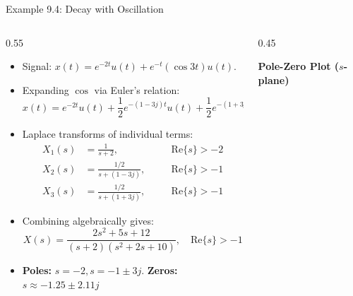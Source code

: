\begin{frame}{Example 9.4: Decay with Oscillation}
    \begin{columns}[T]
        \begin{column}{0.55\textwidth}
            \begin{itemize}
                \item Signal: $x(t) = e^{-2t}u(t) + e^{-t}(\cos 3t)u(t)$.
                \item Expanding $\cos$ via Euler's relation:
                      \begin{equation*}
                          x(t) = e^{-2t}u(t) + \frac{1}{2}e^{-(1-3j)t}u(t) + \frac{1}{2}e^{-(1+3j)t}u(t)
                      \end{equation*}
                \item Laplace transforms of individual terms:
                      \begin{align*}
                          X_1(s) & = \frac{1}{s+2}, \quad        &  & \text{Re}\{s\} > -2 \\
                          X_2(s) & = \frac{1/2}{s+(1-3j)}, \quad &  & \text{Re}\{s\} > -1 \\
                          X_3(s) & = \frac{1/2}{s+(1+3j)}, \quad &  & \text{Re}\{s\} > -1
                      \end{align*}
                \item Combining algebraically gives:
                      \begin{equation*}
                          X(s) = \frac{2s^2 + 5s + 12}{(s+2)(s^2 + 2s + 10)}, \quad \text{Re}\{s\} > -1
                      \end{equation*}
                \item \textbf{Poles:} $s = -2, s = -1 \pm 3j$. \textbf{Zeros:} $s \approx -1.25 \pm 2.11j$
            \end{itemize}
        \end{column}
        \begin{column}{0.45\textwidth}
            \begin{center}
                \vspace{0.6cm}
                \textbf{Pole-Zero Plot ($s$-plane)}
                \vspace{0.1cm}


\end{center}
\end{column}
\end{columns}
\end{frame}
